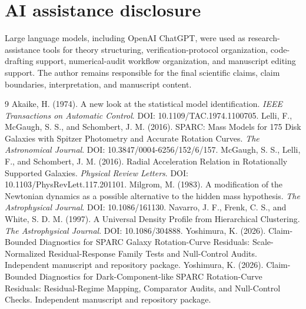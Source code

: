 \documentclass[11pt]{article}
\begin{document}
\section{AI assistance disclosure}
Large language models, including OpenAI ChatGPT, were used as research-assistance tools for theory structuring, verification-protocol organization, code-drafting support, numerical-audit workflow organization, and manuscript editing support. The author remains responsible for the final scientific claims, claim boundaries, interpretation, and manuscript content.

\begin{thebibliography}{9}
 Akaike, H. (1974). A new look at the statistical model identification. \textit{IEEE Transactions on Automatic Control}. DOI: 10.1109/TAC.1974.1100705.
 Lelli, F., McGaugh, S. S., and Schombert, J. M. (2016). SPARC: Mass Models for 175 Disk Galaxies with Spitzer Photometry and Accurate Rotation Curves. \textit{The Astronomical Journal}. DOI: 10.3847/0004-6256/152/6/157.
 McGaugh, S. S., Lelli, F., and Schombert, J. M. (2016). Radial Acceleration Relation in Rotationally Supported Galaxies. \textit{Physical Review Letters}. DOI: 10.1103/PhysRevLett.117.201101.
 Milgrom, M. (1983). A modification of the Newtonian dynamics as a possible alternative to the hidden mass hypothesis. \textit{The Astrophysical Journal}. DOI: 10.1086/161130.
 Navarro, J. F., Frenk, C. S., and White, S. D. M. (1997). A Universal Density Profile from Hierarchical Clustering. \textit{The Astrophysical Journal}. DOI: 10.1086/304888.
 Yoshimura, K. (2026). Claim-Bounded Diagnostics for SPARC Galaxy Rotation-Curve Residuals: Scale-Normalized Residual-Response Family Tests and Null-Control Audits. Independent manuscript and repository package.
 Yoshimura, K. (2026). Claim-Bounded Diagnostics for Dark-Component-like SPARC Rotation-Curve Residuals: Residual-Regime Mapping, Comparator Audits, and Null-Control Checks. Independent manuscript and repository package.
\end{thebibliography}
\end{document}
